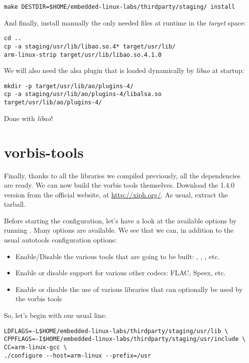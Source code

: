 \begin{verbatim}
make DESTDIR=$HOME/embedded-linux-labs/thirdparty/staging/ install
\end{verbatim}

And finally, install manually the only needed files at runtime in the
{\em target} space:

\begin{verbatim}
cd ..
cp -a staging/usr/lib/libao.so.4* target/usr/lib/
arm-linux-strip target/usr/lib/libao.so.4.1.0
\end{verbatim}

We will also need the alsa plugin that is loaded dynamically by
{\em libao} at startup:
\begin{verbatim}
mkdir -p target/usr/lib/ao/plugins-4/
cp -a staging/usr/lib/ao/plugins-4/libalsa.so target/usr/lib/ao/plugins-4/
\end{verbatim}

Done with {\em libao}!

\section{vorbis-tools}

Finally, thanks to all the libraries we compiled previously, all the
dependencies are ready. We can now build the vorbis tools themselves.
Download the 1.4.0 version from the official website, at
\url{http://xiph.org/}. As usual, extract the tarball.

Before starting the configuration, let's have a look at the available
options by running . Many options are
available. We see that we can, in addition to the usual autotools
configuration options:

\begin{itemize}
\item Enable/Disable the various tools that are going to be built:
  , , , etc.
\item Enable or disable support for various other codecs: FLAC, Speex,
  etc.
\item Enable or disable the use of various libraries that can
  optionally be used by the vorbis tools
\end{itemize}

So, let's begin with our usual  line:

\begin{verbatim}
LDFLAGS=-L$HOME/embedded-linux-labs/thirdparty/staging/usr/lib \
CPPFLAGS=-I$HOME/embedded-linux-labs/thirdparty/staging/usr/include \
CC=arm-linux-gcc \
./configure --host=arm-linux --prefix=/usr
\end{verbatim}


